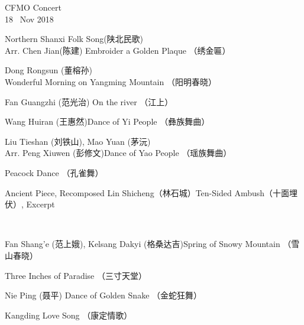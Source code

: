 \documentclass[letter,6pt,poets]{ConcProg}
\begin{document}
\begin{programme}{
    CFMO Concert
\\  {\normalsize 18 ~Nov 2018}
}
\begin{part}[]
    \begin{composition}{Northern Shanxi Folk Song(陕北民歌)\\Arr. Chen Jian(陈建)} {}{Embroider a Golden Plaque  （绣金匾）}{}
    \end{composition}
    \begin{composition}{Dong Rongsun (董榕孙)} {}{Wonderful Morning on Yangming Mountain  （阳明春晓）
}{}
    \end{composition}
    \begin{composition}{Fan Guangzhi (范光治)} {}{On the river （江上）}{}
    \end{composition}
    \begin{composition}{Wang Huiran (王惠然)}{}{Dance of Yi People  （彝族舞曲）}{}
                   {}{}
    \end{composition}
    \begin{composition}{Liu Tieshan (刘铁山), Mao Yuan (茅沅) \\Arr. Peng Xiuwen (彭修文)}{}{Dance of Yao People  （瑶族舞曲）}{}
    \end{composition}
    \begin{composition}{}{}{Peacock Dance （孔雀舞） }{}
    \end{composition}
    \begin{composition}{Ancient Piece, Recomposed Lin Shicheng（林石城）}{}{Ten-Sided Ambush（十面埋伏）, Excerpt}{}
    \end{composition}\\
    \begin{composition}{Fan Shang'e (范上娥), Kelsang Dakyi (格桑达吉)}{}{Spring of Snowy Mountain   （雪山春晓）}{}
                   {}{}
    \end{composition}
    \begin{composition}{}{}{Three Inches of Paradise  （三寸天堂）}{}
    \end{composition}
    \begin{composition}{Nie Ping (聂平)} {}{Dance of Golden Snake  （金蛇狂舞）}{}
    \end{composition}
    \begin{composition}{}{}{Kangding Love Song  （康定情歌）}{}

\end{composition}
\end{part}
\end{programme}
\end{document}
